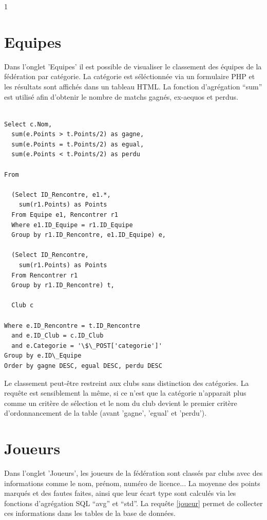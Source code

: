 1\documentclass[a4paper»,8pt,french,fleqn]{report}
\begin{document}
\section{Equipes}

Dans l'onglet 'Equipes' il est possible de visualiser le classement des équipes de la fédération par catégorie. La catégorie est séléctionnée via un formulaire PHP et les résultats sont affichés dans un tableau HTML. La fonction d'agrégation ``sum'' est utilisé afin d'obtenir le nombre de matchs gagnés, ex-aequos et perdus. 

\begin{lstlisting}

Select c.Nom,
  sum(e.Points > t.Points/2) as gagne,
  sum(e.Points = t.Points/2) as egual,
  sum(e.Points < t.Points/2) as perdu
  
From
  
  (Select ID_Rencontre, e1.*,
    sum(r1.Points) as Points
  From Equipe e1, Rencontrer r1
  Where e1.ID_Equipe = r1.ID_Equipe
  Group by r1.ID_Rencontre, e1.ID_Equipe) e,

  (Select ID_Rencontre,
    sum(r1.Points) as Points
  From Rencontrer r1
  Group by r1.ID_Rencontre) t,
  
  Club c

Where e.ID_Rencontre = t.ID_Rencontre
  and e.ID_Club = c.ID_Club
  and e.Categorie = '\$\_POST['categorie']'
Group by e.ID\_Equipe
Order by gagne DESC, egual DESC, perdu DESC

\end{lstlisting}

Le classement peut-être restreint aux clubs sans distinction des catégories. La requête est sensiblement la même, si ce n'est que la catégorie n'apparait plus comme un critère de sélection et le nom du club devient le premier critère d'ordonnancement de la table (avant 'gagne', 'egual' et 'perdu'). 


\section{Joueurs}
Dans l'onglet 'Joueurs', les joueurs de la fédération sont classés par clubs avec des informations comme le nom, prénom, numéro de licence... La moyenne des points marqués et des fautes faites, ainsi que leur écart type sont calculés via les fonctions d'agrégation SQL ``avg'' et ``std''. La requête \ref{joueur} permet de collecter ces informations dans les tables de la base de données.
\end{document}
